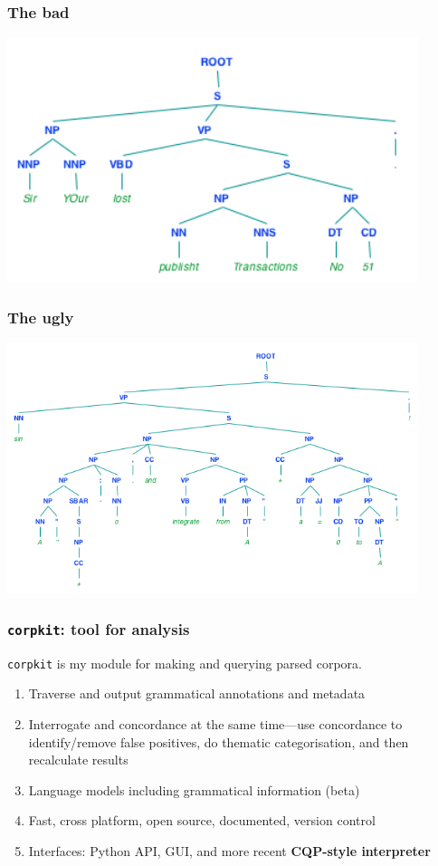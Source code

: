 \documentclass{beamer}       %
\begin{document}
\begin{frame}
    \frametitle{The bad}
    \centering
    \includegraphics[width=0.90\textwidth]{../images/bad}
\end{frame}

\begin{frame}
    \frametitle{The ugly}
    \centering
    \includegraphics[width=0.90\textwidth]{../images/ugly}
\end{frame}



\begin{frame}
\frametitle{\texttt{corpkit}: tool for analysis}

\texttt{corpkit} is my module for making and querying parsed corpora.

\begin{enumerate}
    \item Traverse and output grammatical annotations and metadata
    \item Interrogate and concordance at the same time---use concordance to identify\slash remove false positives, do thematic categorisation, and then recalculate results
    \item Language models including grammatical information (beta)
    \item Fast, cross platform, open source, documented, version control 
    \item Interfaces: Python API, GUI, and more recent \textbf{CQP-style interpreter}
\end{enumerate}
\end{frame}
\end{document}
